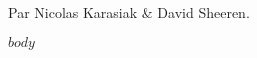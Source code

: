 \documentclass[$FONT_SIZES$]{scrartcl}
\begin{document}
\date{}
\maketitle
Par Nicolas Karasiak \& David Sheeren. 
\\
\tableofcontents
\pagebreak

$body$
\end{document}
